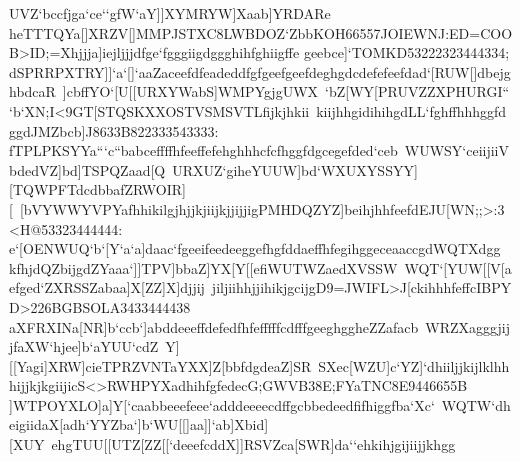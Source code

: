 {{{ UVZ`bccfjga`ce``gfW`aY]]XYMRYW]Xaab]YRDARe%
 heTTTQYa[]XRZV[]MMPJSTXC8LWBDOZ`ZbbKOH66557JOIEWNJ:ED=COOB>ID;=Xhjjja]iejljjjdfge`fgggiigdggghihfghiigffe%
 geebce]`TOMKD53222323444334;}
 \hbox{dSPRRPXTRY]]`a`[]`aaZaceefdfeadeddfgfgeefgeefdeghgdcdefefeefdad`[RUW[]dbejghbdcaR%
 ]cbffYO`[U[[URXYWabS]WMPYgjgUWX%
 `bZ[WY[PRUVZZXPHURGI```b`XN;I<9GT[STQSKXXOSTVSMSVTLfijkjhkii%
 kiijhhgidihihgdLL`fghffhhhggfdggdJMZbcb]J8633B822333543333:}
 \hbox{fTPLPKSYYa```c``babceffffhfeeffefehghhhcfcfhggfdgcegefded`ceb%
 WUWSY`ceiijiiVbdedVZ]bd]TSPQZaad[Q%
 URXUZ`giheYUUW]bd`WXUXYSSYY][TQWPFTdcdbbafZRWOIR][%
 [bVYWWYVPYafhhikilgjhjjkjiijkjjijjigPMHDQZYZ]beihjhhfeefdEJU[WN;;>:3<H@53323444444:}
 \hbox{e`[OENWUQ`b`[Y`a`a]daac`fgeeifeedeeggefhgfddaeffhfegihggeceaaccgdWQTXdgg%
 kfhjdQZbijgdZYaaa`]]TPV]bbaZ]YX[Y[[efiWUTWZaedXVSSW%
 WQT`[YUW[[V[aefged`ZXRSSZabaa]X[ZZ]X]djjij%
 jiljiihhjjihikjgcijgD9=JWIFL>J[ckihhhfeffcIBPYD>226BGBSOLA3433444438}
 \hbox{aXFRXINa[NR]b`ccb`]abddeeeffdefedfhfefffffcdfffgeeghggheZZafacb%
 WRZXagggjijjfaXW`hjee]b`aYUU`cdZ%
 Y][[Yagi]XRW]cieTPRZVNTaYXX]Z[bbfdgdeaZ]SR%
 SXec[WZU]c`YZ]`dhiiljjkijlklhhhijjkjkgiijicS<>RWHPYXadhihfgfedecG;GWVB38E;FYaTNC8E9446655B}
 \hbox{]WTPOYXLO]a]Y[`caabbeeefeee`adddeeeecdffgcbbedeedfifhiggfba`Xc`%
 WQTW`dheigiidaX[adh`YYZba`]b`WU[[]aa]]`ab]Xbid][XUY%
 ehgTUU[[UTZ[ZZ[[`deeefcddX]]RSVZca[SWR]da``ehkihjgijiijjkhgg%
}}}
